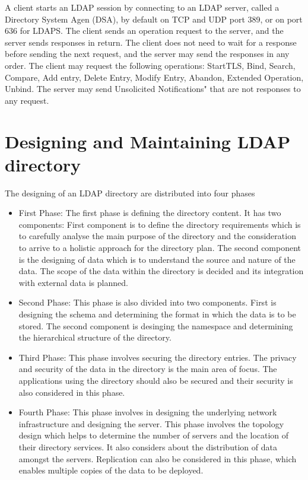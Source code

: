 \documentclass[9pt,twocolumn,twoside]{../../styles/osajnl}
\begin{document}
A client starts an LDAP session by connecting to an LDAP server,
called a Directory System Agen (DSA), by default on TCP and UDP port
389, or on port 636 for LDAPS. The client sends an operation request
to the server, and the server sends responses in return. The client
does not need to wait for a response before sending the next request,
and the server may send the responses in any order. The client may request
the following operations: StartTLS, Bind, Search, Compare, Add entry,
Delete Entry, Modify Entry, Abandon, Extended Operation, Unbind. The
server may send Unsolicited Notifications" that are not responses to any
request.

\section{Designing and Maintaining LDAP directory}
The designing of an LDAP directory are distributed into four phases
\cite{www-ldap-design}
\begin{itemize}
\item First Phase: The first phase is defining the directory
  content. It has two components: First component is to define the
  directory requirements which is to carefully analyse the main
  purpose of the directory and the consideration to arrive to a
  holistic approach for the directory plan.  The second component is
  the designing of data which is to understand the source and nature
  of the data. The scope of the data within the directory is decided
  and its integration with external data is
  planned. \cite{www-ldap-design}

\item Second Phase: This phase is also divided into two
  components. First is designing the schema and determining the format
  in which the data is to be stored. The second component is desinging
  the namespace and determining the hierarchical structure of the
  directory.

\item Third Phase: This phase involves securing the directory
  entries. The privacy and security of the data in the directory is
  the main area of focus.  The applications using the directory should
  also be secured and their security is also considered in this phase.

\item Fourth Phase: This phase involves in designing the underlying
  network infrastructure and designing the server. This phase involves
  the topology design which helps to determine the number of servers
  and the location of their directory services. It also considers
  about the distribution of data amongst the servers. Replication can
  also be considered in this phase, which enables multiple copies of
  the data to be deployed. \cite{www-ldap-design}
  
\end{itemize}
\end{document}
